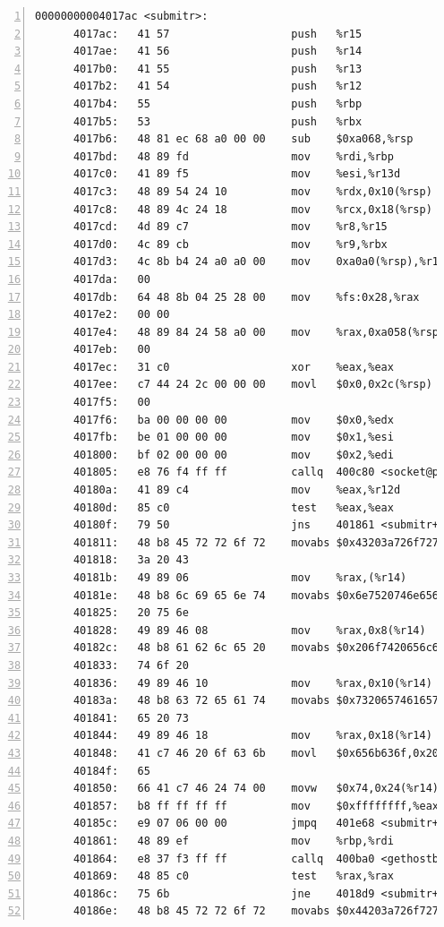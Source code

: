 \documentclass{article}
\begin{document}
\begin{lstlisting}[title = bomb的反汇编代码及部分注释, xleftmargin = 2em,xrightmargin = 2em, aboveskip = 1em, numbers = left, basicstyle=\scriptsize\ttfamily, numberstyle=\scriptsize]
    00000000004017ac <submitr>:
      4017ac:	41 57                	push   %r15
      4017ae:	41 56                	push   %r14
      4017b0:	41 55                	push   %r13
      4017b2:	41 54                	push   %r12
      4017b4:	55                   	push   %rbp
      4017b5:	53                   	push   %rbx
      4017b6:	48 81 ec 68 a0 00 00 	sub    $0xa068,%rsp
      4017bd:	48 89 fd             	mov    %rdi,%rbp
      4017c0:	41 89 f5             	mov    %esi,%r13d
      4017c3:	48 89 54 24 10       	mov    %rdx,0x10(%rsp)
      4017c8:	48 89 4c 24 18       	mov    %rcx,0x18(%rsp)
      4017cd:	4d 89 c7             	mov    %r8,%r15
      4017d0:	4c 89 cb             	mov    %r9,%rbx
      4017d3:	4c 8b b4 24 a0 a0 00 	mov    0xa0a0(%rsp),%r14
      4017da:	00 
      4017db:	64 48 8b 04 25 28 00 	mov    %fs:0x28,%rax
      4017e2:	00 00 
      4017e4:	48 89 84 24 58 a0 00 	mov    %rax,0xa058(%rsp)
      4017eb:	00 
      4017ec:	31 c0                	xor    %eax,%eax
      4017ee:	c7 44 24 2c 00 00 00 	movl   $0x0,0x2c(%rsp)
      4017f5:	00 
      4017f6:	ba 00 00 00 00       	mov    $0x0,%edx
      4017fb:	be 01 00 00 00       	mov    $0x1,%esi
      401800:	bf 02 00 00 00       	mov    $0x2,%edi
      401805:	e8 76 f4 ff ff       	callq  400c80 <socket@plt>
      40180a:	41 89 c4             	mov    %eax,%r12d
      40180d:	85 c0                	test   %eax,%eax
      40180f:	79 50                	jns    401861 <submitr+0xb5>
      401811:	48 b8 45 72 72 6f 72 	movabs $0x43203a726f727245,%rax
      401818:	3a 20 43 
      40181b:	49 89 06             	mov    %rax,(%r14)
      40181e:	48 b8 6c 69 65 6e 74 	movabs $0x6e7520746e65696c,%rax
      401825:	20 75 6e 
      401828:	49 89 46 08          	mov    %rax,0x8(%r14)
      40182c:	48 b8 61 62 6c 65 20 	movabs $0x206f7420656c6261,%rax
      401833:	74 6f 20 
      401836:	49 89 46 10          	mov    %rax,0x10(%r14)
      40183a:	48 b8 63 72 65 61 74 	movabs $0x7320657461657263,%rax
      401841:	65 20 73 
      401844:	49 89 46 18          	mov    %rax,0x18(%r14)
      401848:	41 c7 46 20 6f 63 6b 	movl   $0x656b636f,0x20(%r14)
      40184f:	65 
      401850:	66 41 c7 46 24 74 00 	movw   $0x74,0x24(%r14)
      401857:	b8 ff ff ff ff       	mov    $0xffffffff,%eax
      40185c:	e9 07 06 00 00       	jmpq   401e68 <submitr+0x6bc>
      401861:	48 89 ef             	mov    %rbp,%rdi
      401864:	e8 37 f3 ff ff       	callq  400ba0 <gethostbyname@plt>
      401869:	48 85 c0             	test   %rax,%rax
      40186c:	75 6b                	jne    4018d9 <submitr+0x12d>
      40186e:	48 b8 45 72 72 6f 72 	movabs $0x44203a726f727245,%rax

\end{lstlisting}
\end{document}
